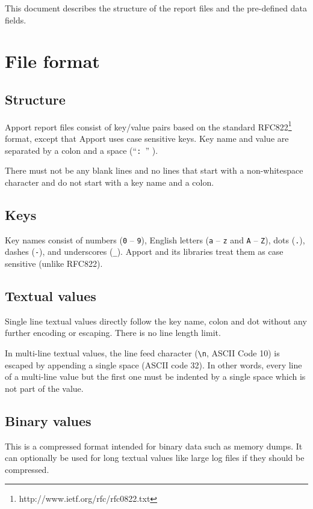 \documentclass[DIV12,halfparskip]{scrartcl}
\begin{document}
This document describes the structure of the report files and the pre-defined data
fields.

\section{File format}

\subsection{Structure}

Apport report files consist of key/value pairs based on the standard
RFC822\footnote{http://www.ietf.org/rfc/rfc0822.txt} format, except that Apport
uses case sensitive keys. Key name and value are separated by a colon and a
space (``\verb!: !'' ).

There must not be any blank lines and no lines that start with a non-whitespace
character and do not start with a key name and a colon.

\subsection{Keys}

Key names consist of numbers (\verb!0! -- \verb!9!), English letters (\verb!a!
-- \verb!z! and \verb!A! -- \verb!Z!), dots (\verb!.!), dashes (\verb!-!), and
underscores (\verb!_!). Apport and its libraries treat them as case sensitive
(unlike RFC822).

\subsection{Textual values}

Single line textual values directly follow the key name, colon and dot without
any further encoding or escaping. There is no line length limit.

In multi-line textual values, the line feed character (\verb!\n!, ASCII Code
10) is escaped by appending a single space (ASCII code 32). In other words,
every line of a multi-line value but the first one must be indented by a single
space which is not part of the value.

\subsection{Binary values}

This is a compressed format intended for binary data such as memory dumps. It
can optionally be used for long textual values like large log files if they
should be compressed.
\end{document}
